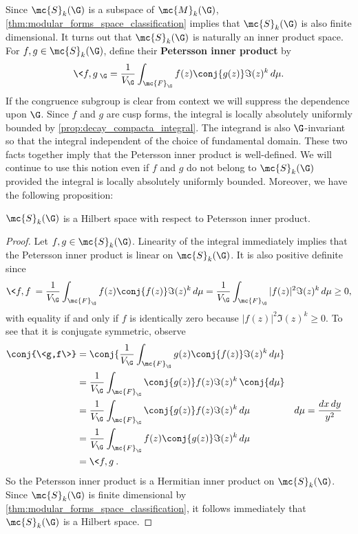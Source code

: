    Since $\mc{S}_{k}(\G)$ is a subspace of $\mc{M}_{k}(\G)$, \cref{thm:modular_forms_space_classification} implies that $\mc{S}_{k}(\G)$ is also finite dimensional. It turns out that $\mc{S}_{k}(\G)$ is naturally an inner product space. For $f,g \in \mc{S}_{k}(\G)$, define their \textbf{Petersson inner product} by
    \[
      \<f,g\>_{\G} = \frac{1}{V_{\G}}\int_{\mc{F}_{\G}}f(z)\conj{g(z)}\Im(z)^{k}\,d\mu.
    \]
    If the congruence subgroup is clear from context we will suppress the dependence upon $\G$. Since $f$ and $g$ are cusp forms, the integral is locally absolutely uniformly bounded by \cref{prop:decay_compacta_integral}. The integrand is also $\G$-invariant so that the integral independent of the choice of fundamental domain. These two facts together imply that the Petersson inner product is well-defined. We will continue to use this notion even if $f$ and $g$ do not belong to $\mc{S}_{k}(\G)$ provided the integral is locally absolutely uniformly bounded. Moreover, we have the following proposition:

    \begin{proposition}\label{prop:Petersson_inner_product_hermitian}
      $\mc{S}_{k}(\G)$ is a Hilbert space with respect to Petersson inner product.
    \end{proposition}
    \begin{proof}
      Let $f,g \in \mc{S}_{k}(\G)$. Linearity of the integral immediately implies that the Petersson inner product is linear on $\mc{S}_{k}(\G)$. It is also positive definite since
      \[
        \<f,f\> = \frac{1}{V_{\G}}\int_{\mc{F}_{\G}}f(z)\conj{f(z)}\Im(z)^{k}\,d\mu = \frac{1}{V_{\G}}\int_{\mc{F}_{\G}}|f(z)|^{2}\Im(z)^{k}\,d\mu \ge 0,
      \]
      with equality if and only if $f$ is identically zero because $|f(z)|^{2}\Im(z)^{k} \ge 0$. To see that it is conjugate symmetric, observe
      \begin{align*}
        \conj{\<g,f\>} &= \conj{\frac{1}{V_{\G}}\int_{\mc{F}_{\G}}g(z)\conj{f(z)}\Im(z)^{k}\,d\mu} \\
        &= \frac{1}{V_{\G}}\int_{\mc{F}_{\G}}\conj{g(z)}f(z)\Im(z)^{k}\,\conj{d\mu} \\
        &= \frac{1}{V_{\G}}\int_{\mc{F}_{\G}}\conj{g(z)}f(z)\Im(z)^{k}\,d\mu && \text{$d\mu = \frac{dx\,dy}{y^{2}}$} \\
        &= \frac{1}{V_{\G}}\int_{\mc{F}_{\G}}f(z)\conj{g(z)}\Im(z)^{k}\,d\mu \\
        &= \<f,g\>.
      \end{align*}
      So the Petersson inner product is a Hermitian inner product on $\mc{S}_{k}(\G)$. Since $\mc{S}_{k}(\G)$ is finite dimensional by \cref{thm:modular_forms_space_classification}, it follows immediately that $\mc{S}_{k}(\G)$ is a Hilbert space.
    \end{proof}

